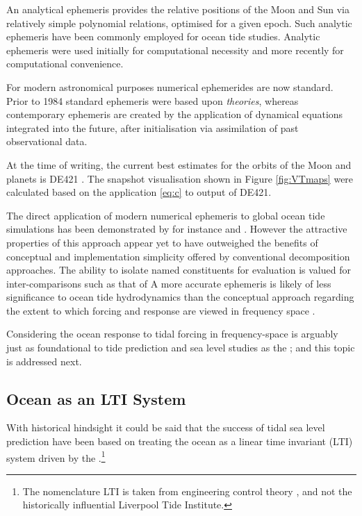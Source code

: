 An analytical ephemeris provides the relative positions of the Moon and Sun via relatively simple polynomial relations, optimised for a given epoch.  Such analytic ephemeris have been commonly employed for ocean tide studies.   Analytic ephemeris were used initially for computational necessity and more recently for computational convenience.


For modern astronomical purposes numerical ephemerides are now standard.  Prior to 1984 standard ephemeris were based upon \emph{theories}\citep[sec 8.1]{Urban:2013vl}, whereas contemporary ephemeris are created by the application of dynamical equations integrated into the future, after initialisation via assimilation of past observational data.

At the time of writing, the current best estimates for the orbits of the Moon and planets is DE421 \citep{Folkner:2008wm}.   The snapshot visualisation shown in Figure \ref{fig:VTmaps} were calculated based on the application \ref{eq:c} to output of DE421.


The direct application of modern numerical ephemeris to global ocean tide simulations has been demonstrated by for instance \citep{Weis:2008ex} and \citep{10.1007/s10236-016-1016-1}.
However the attractive properties of this approach appear yet to have outweighed the benefits of conceptual and implementation simplicity offered by conventional decomposition approaches.   The ability to isolate named constituents for evaluation is valued for inter-comparisons such as that of \citep{Stammer:2014vh}
A more accurate ephemeris is likely of less significance to ocean tide hydrodynamics than the conceptual approach regarding the extent to which forcing and response are viewed in frequency space \citep{10.17125/gov2018.ch13}.

Considering the ocean response to tidal forcing in frequency-space is arguably just as foundational to tide prediction and sea level studies as the \ATGP{}; and this topic is addressed next.  

\subsection{Ocean as an LTI System}
\label{sec:LTI}
With historical hindsight it could be said that the success of tidal sea level prediction have been based on treating the ocean as a linear time invariant (LTI) system driven by the \ATGP{}.\footnote{The nomenclature LTI is taken from engineering control theory , and not the historically influential Liverpool Tide Institute.}

